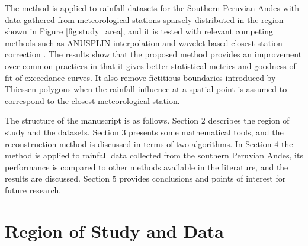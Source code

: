 The method is applied to rainfall datasets for the Southern Peruvian Andes with data gathered from meteorological stations sparsely distributed in the region shown in Figure \ref{fig:study_area}, and it is tested with relevant competing methods such as ANUSPLIN interpolation and wavelet-based closest station correction \citep{Quiroz-et-al_2011}. The results show that the proposed method provides an improvement over common practices in that it gives better statistical metrics  and goodness of fit of exceedance curves. It also remove fictitious boundaries introduced by Thiessen polygons when the rainfall influence at a spatial point is assumed to correspond to the closest meteorological station. 

The structure of the manuscript is as follows. Section $2$ describes the region of study and the datasets. Section $3$ presents some mathematical tools, and the reconstruction method  is discussed in terms of two algorithms. In Section $4$ the method is applied to rainfall data collected from the southern Peruvian Andes, its performance is compared to other   methods available in the literature, and the results are discussed.  Section $5$ provides conclusions and points of interest for future research.  

\section{Region of Study and Data}

